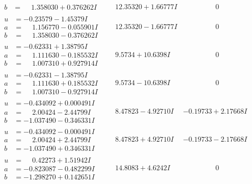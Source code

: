 \documentclass[1p]{elsarticle_modified}
\theoremstyle{definition}
\begin{document}
$$\begin{array}{c|c|c}
\begin{aligned}
b &= \phantom{-}1.358030 + 0.376262 I\end{aligned}
 & \phantom{-}12.35320 + 1.66777 I & \phantom{-0.000000 } 0 \\ \hline\begin{aligned}
u &= -0.23579 - 1.45379 I \\
a &= \phantom{-}1.156770 - 0.055901 I \\
b &= \phantom{-}1.358030 - 0.376262 I\end{aligned}
 & \phantom{-}12.35320 - 1.66777 I & \phantom{-0.000000 } 0 \\ \hline\begin{aligned}
u &= -0.62331 + 1.38795 I \\
a &= \phantom{-}1.111630 - 0.185532 I \\
b &= \phantom{-}1.007310 + 0.927914 I\end{aligned}
 & \phantom{-}9.5734 + 10.6398 I & \phantom{-0.000000 } 0 \\ \hline\begin{aligned}
u &= -0.62331 - 1.38795 I \\
a &= \phantom{-}1.111630 + 0.185532 I \\
b &= \phantom{-}1.007310 - 0.927914 I\end{aligned}
 & \phantom{-}9.5734 - 10.6398 I & \phantom{-0.000000 } 0 \\ \hline\begin{aligned}
u &= -0.434092 + 0.000491 I \\
a &= \phantom{-}2.00424 - 2.44799 I \\
b &= -1.037490 - 0.346331 I\end{aligned}
 & \phantom{-}8.47823 - 4.92710 I & -0.19733 + 2.17668 I \\ \hline\begin{aligned}
u &= -0.434092 - 0.000491 I \\
a &= \phantom{-}2.00424 + 2.44799 I \\
b &= -1.037490 + 0.346331 I\end{aligned}
 & \phantom{-}8.47823 + 4.92710 I & -0.19733 - 2.17668 I \\ \hline\begin{aligned}
u &= \phantom{-}0.42273 + 1.51942 I \\
a &= -0.823087 - 0.482299 I \\
b &= -1.298270 + 0.142651 I\end{aligned}
 & \phantom{-}14.8083 + 4.6242 I & \phantom{-0.000000 } 0 \\ \hline\begin{aligned}

\end{aligned}
\end{array}$$
\end{document}
